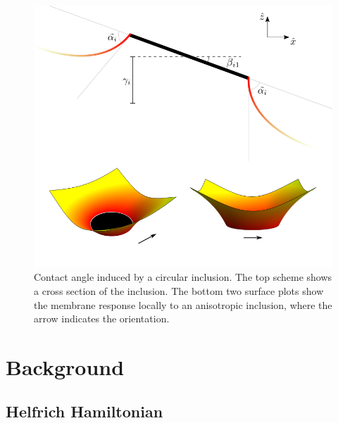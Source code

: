 \begin{figure}[h]
\centering
\includegraphics[width=12cm]{figures/3-elastic-figs/conttil.png}
\caption{Contact angle induced by a circular inclusion. The top scheme shows a cross section of the inclusion. The bottom two surface plots show the membrane response locally to an anisotropic inclusion, where the arrow indicates the orientation.}
\end{figure}

\section{Background}

\subsection{Helfrich Hamiltonian}

